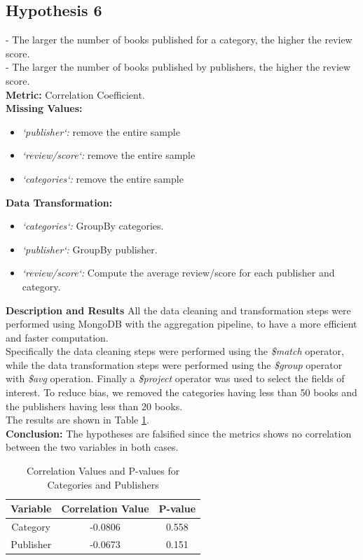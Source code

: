 \subsection*{Hypothesis 6}

- The larger the number of books published for a category, the higher the review score.\\ 
- The larger the number of books published by publishers, the higher the review score.\\
\noindent
\textbf{Metric:} Correlation Coefficient.\\
\noindent
\textbf{Missing Values:}
\begin{itemize}
\item \textit{`publisher`:} remove the entire sample
\item \textit{`review/score`:} remove the entire sample
\item \textit{`categories`:} remove the entire sample
\end{itemize}
\noindent
\textbf{Data Transformation:}
\begin{itemize}
    \item \textit{`categories`:} GroupBy categories.
    \item \textit{`publisher`:} GroupBy publisher.
    \item \textit{`review/score`:} Compute the average review/score for each publisher and category.
\end{itemize}\vspace{0.5cm}
\noindent
\textbf{Description and Results}
All the data cleaning and transformation steps were performed using MongoDB with the aggregation pipeline, to have a more efficient and faster computation.\\
Specifically the data cleaning steps were performed using the \textit{\$match} operator, while the data transformation steps were performed using the \textit{\$group} operator with \textit{\$avg} operation.
Finally a \textit{\$project} operator was used to select the fields of interest. To reduce bias, we removed the categories having less than 50 books and the publishers having less than 20 books.\\
The results are shown in Table \ref{tab:h6_correlations}.\\
\textbf{Conclusion:} The hypotheses are falsified since the metrics shows no correlation between the two variables in both cases.

\begin{table}[H]
    \centering
    \caption{Correlation Values and P-values for Categories and Publishers}
    \begin{tabular}{|c|c|c|}
    \hline
    \textbf{Variable} & \textbf{Correlation Value} & \textbf{P-value} \\
    \hline
    Category & -0.0806 & 0.558 \\
    \hline
    Publisher & -0.0673 & 0.151 \\
    \hline
    \end{tabular}
    \label{tab:h6_correlations}
\end{table}

